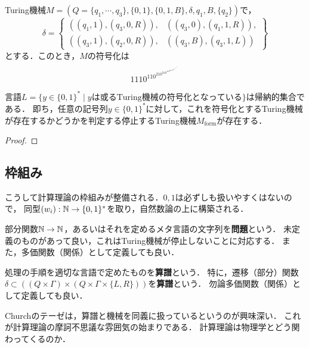 \documentclass[uplatex, dvipdfmx]{jsreport}
\begin{document}
\begin{example}
    Turing機械$M=(Q=\{q_1,\cdots,q_3\},\{0,1\},\{0,1,B\},\delta,q_1,B,\{q_2\})$で，
    \[\delta=\left\{\begin{array}{ll}
        ((q_1,1),(q_3,0,R)),&((q_3,0),(q_1,1,R)),\\
        ((q_3,1),(q_2,0,R)),&((q_3,B),(q_3,1,L))
    \end{array}\right\}\]
    とする．このとき，$M$の符号化は
    \[1110^110^210^310^110^2110^310^110^110^210^2110^310^210^210^110^2110^310^310^310^210^1111\]
\end{example}

\begin{proposition}\label{prop-encoding-of-Turing-machine-is-computable}
    言語$L=\{y\in\{0,1\}^*\mid yは或る\mathrm{Turing}機械の符号化となっている\}$は帰納的集合である．
    即ち，任意の記号列$y\in\{0,1\}^*$に対して，これを符号化とするTuring機械が存在するかどうかを判定する停止するTuring機械$M_{\mathrm{form}}$が存在する．
\end{proposition}
\begin{proof}
    
\end{proof}

\subsection{枠組み}

\begin{tcolorbox}[colframe=ForestGreen, colback=ForestGreen!10!white, breakable]
    こうして計算理論の枠組みが整備される．$0,1$は必ずしも扱いやすくはないので，
    同型$(w_i):\mathbb{N}\to\{0,1\}^*$を取り，自然数論の上に構築される．
\end{tcolorbox}

\begin{definition}[problem]
    部分関数$\mathbb{N}\to\mathbb{N}$，あるいはそれを定めるメタ言語の文字列を\textbf{問題}という．
    未定義のものがあって良い，これはTuring機械が停止しないことに対応する．
    また，多価関数（関係）として定義しても良い．
\end{definition}

\begin{definition}[algorithm]\label{def-algorithm}
    処理の手順を適切な言語で定めたものを\textbf{算譜}という．
    特に，遷移（部分）関数$\delta\subset((Q\times\Gamma)\times(Q\times\Gamma\times\{L,R\}))$を\textbf{算譜}という．
    勿論多価関数（関係）として定義しても良い．
\end{definition}
\begin{remark}
    Churchのテーゼは，算譜と機械を同義に扱っているというのが興味深い．
    これが計算理論の摩訶不思議な雰囲気の始まりである．
    計算理論は物理学とどう関わってくるのか．
\end{remark}
\end{document}
